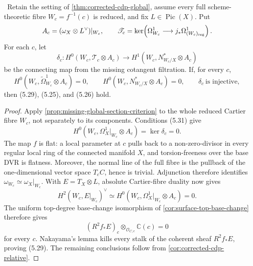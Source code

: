 \begin{theorem}
\label{thm:corrected-cdp-fibrewise}
\Verified\ Retain the setting of
\cref{thm:corrected-cdp-global}, assume every full scheme-theoretic fibre
\(W_c=f^{-1}(c)\) is reduced, and fix \(L\in\operatorname{Pic}(X)\).  Put
\[
 A_c=(\omega_X\otimes L^\vee)|_{W_c},\qquad
 \mathscr T_c=\ker\!\left(
 \Omega^1_{W_c}\longrightarrow
 j_*\Omega^1_{(W_c)_{\rm reg}}\right).
\]
For each \(c\), let
\[
 \delta_c:
 H^0(W_c,\mathscr T_c\otimes A_c)
 \longrightarrow
 H^1(W_c,N^*_{W_c/X}\otimes A_c)
\tag{5.30}
\]
be the connecting map from the missing cotangent filtration.  If, for every
\(c\),
\[
 H^0(W_c,\widetilde\Omega^1_{W_c}\otimes A_c)=0,\qquad
 H^0(W_c,N^*_{W_c/X}\otimes A_c)=0,\qquad
 \delta_c\ \text{is injective},
\tag{5.31}
\]
then (5.29), (5.25), and (5.26) hold.
\end{theorem}

\begin{proof}
Apply \cref{prop:missing-global-section-criterion} to the whole reduced
Cartier fibre \(W_c\), not separately to its components.  Conditions (5.31)
give
\[
 H^0(W_c,\Omega_X^1|_{W_c}\otimes A_c)
 =\ker\delta_c=0.
\tag{5.32}
\]
The map \(f\) is flat: a local parameter at \(c\) pulls back to a
non-zero-divisor in every regular local ring of the connected manifold \(X\),
and torsion-freeness over the base DVR is flatness.  Moreover, the normal
line of the full fibre is the pullback of the one-dimensional vector space
\(T_cC\), hence is trivial.  Adjunction therefore identifies
\(\omega_{W_c}\simeq\omega_X|_{W_c}\).  With \(E=T_X\otimes L\), absolute
Cartier-fibre duality now gives
\[
 H^2(W_c,E|_{W_c})^\vee
 \simeq H^0(W_c,\Omega_X^1|_{W_c}\otimes A_c)=0.
\]
The uniform top-degree base-change isomorphism of
\cref{cor:surface-top-base-change} therefore gives
\[
 (R^2f_*E)_c\otimes_{\mathcal O_{C,c}}\mathbb C(c)=0
\]
for every \(c\).  Nakayama's lemma kills every stalk of the coherent sheaf
\(R^2f_*E\), proving (5.29).  The remaining conclusions follow from
\cref{cor:corrected-cdp-relative}.
\end{proof}

